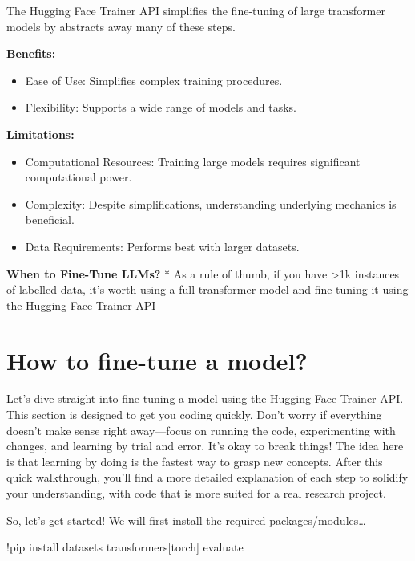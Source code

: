 \documentclass[
  letterpaper,
  DIV=11,
  numbers=noendperiod]{scrreprt}
\newenvironment{Shaded}{\begin{snugshade}}{\end{snugshade}}
\newcommand{\NormalTok}[1]{\textcolor[rgb]{0.00,0.23,0.31}{#1}}
\newcommand{\OperatorTok}[1]{\textcolor[rgb]{0.37,0.37,0.37}{#1}}
\providecommand{\tightlist}{%
  \setlength{\itemsep}{0pt}\setlength{\parskip}{0pt}}\usepackage{longtable,booktabs,array}
\begin{document}
The Hugging Face Trainer API simplifies the fine-tuning of large
transformer models by abstracts away many of these steps.

\textbf{Benefits:}

\begin{itemize}
\tightlist
\item
  Ease of Use: Simplifies complex training procedures.
\item
  Flexibility: Supports a wide range of models and tasks.
\end{itemize}

\textbf{Limitations:}

\begin{itemize}
\tightlist
\item
  Computational Resources: Training large models requires significant
  computational power.
\item
  Complexity: Despite simplifications, understanding underlying
  mechanics is beneficial.
\item
  Data Requirements: Performs best with larger datasets.
\end{itemize}

\textbf{When to Fine-Tune LLMs?} * As a rule of thumb, if you have
\textgreater1k instances of labelled data, it's worth using a full
transformer model and fine-tuning it using the Hugging Face Trainer API

\section{How to fine-tune a model?}\label{how-to-fine-tune-a-model}

Let's dive straight into fine-tuning a model using the Hugging Face
Trainer API. This section is designed to get you coding quickly. Don't
worry if everything doesn't make sense right away---focus on running the
code, experimenting with changes, and learning by trial and error. It's
okay to break things! The idea here is that learning by doing is the
fastest way to grasp new concepts. After this quick walkthrough, you'll
find a more detailed explanation of each step to solidify your
understanding, with code that is more suited for a real research
project.

So, let's get started! We will first install the required
packages/modules\ldots{}

\begin{Shaded}
\begin{Highlighting}[]
\OperatorTok{!}\NormalTok{pip install datasets transformers[torch] evaluate}
\end{Highlighting}
\end{Shaded}
\end{document}
